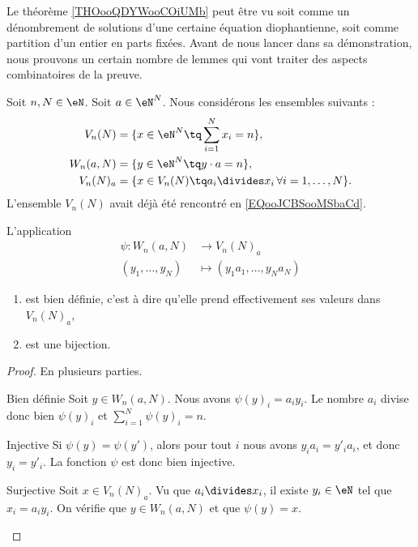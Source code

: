 Le théorème \ref{THOooQDYWooCOiUMb} peut être vu soit comme un dénombrement de solutions d'une certaine équation diophantienne, soit comme partition d'un entier en parts fixées. Avant de nous lancer dans sa démonstration, nous prouvons un certain nombre de lemmes qui vont traiter des aspects combinatoires de la preuve.

Soit \( n,N\in \eN\). Soit \( a\in \eN^N\). Nous considérons les ensembles suivants :
\begin{subequations}
    \begin{align}
    V_n(N)&=\{ x\in \eN^N\tq \sum_{i=1}^Nx_i=n \}, \\
    W_n(a,N)&=\{ y\in \eN^N\tq y\cdot a=n \},\\
    V_n(N)_a&=\{ x\in V_n(N)\tq a_i\divides x_i\,\forall i=1,\ldots, N \}.
    \end{align}
\end{subequations}
L'ensemble \( V_n(N)\) avait déjà été rencontré en \eqref{EQooJCBSooMSbaCd}.

\begin{lemma}       \label{LEMooLKCAooCeDnSj}
    L'application
    \begin{equation}
        \begin{aligned}
            \psi\colon W_n(a,N)&\to V_n(N)_a \\
            (y_1,\ldots, y_N)&\mapsto (y_1a_1,\ldots, y_Na_N) 
        \end{aligned}
    \end{equation}
    \begin{enumerate}
        \item       
            est bien définie, c'est à dire qu'elle prend effectivement ses valeurs dans \( V_n(N)_a\),
        \item
            est une bijection.
    \end{enumerate}
\end{lemma}

\begin{proof}
    En plusieurs parties.
    \begin{subproof}
        \item[Bien définie]
            Soit \( y\in W_n(a,N)\). Nous avons \( \psi(y)_i=a_iy_i\). Le nombre \( a_i\) divise donc bien \( \psi(y)_i\) et \( \sum_{i=1}^N\psi(y)_i=n\).
        \item[Injective]
            Si \( \psi(y)=\psi(y')\), alors pour tout \( i\) nous avons \( y_ia_i=y'_ia_i\), et donc \( y_i=y'_i\). La fonction \( \psi\) est donc bien injective.
        \item[Surjective]
            Soit \( x\in V_n(N)_a\). Vu que \( a_i\divides x_i\), il existe \( y_i\in \eN\) tel que \( x_i=a_iy_i\). On vérifie que \( y\in W_n(a,N)\) et que \( \psi(y)=x\).
    \end{subproof}
\end{proof}


